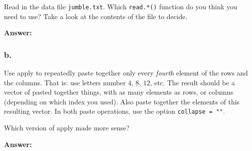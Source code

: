 \documentclass[]{article}
\begin{document}
Read in the data file \texttt{jumble.txt}. Which \texttt{read.*()}
function do you think you need to use? Take a look at the contents of
the file to decide.

\textbf{Answer:}

\hypertarget{b.-7}{%
\subsubsection{b.}\label{b.-7}}

Use apply to repeatedly paste together only every \emph{fourth} element
of the rows and the columns. That is: use letters number \(4\), \(8\),
\(12\), etc. The result should be a vector of pasted together things,
with as many elements as rows, or columns (depending on which index you
used). Also paste together the elements of this resulting vector. In
both paste operations, use the option \texttt{collapse\ =\ ""}.

Which version of apply made more sense?

\textbf{Answer:}
\end{document}
